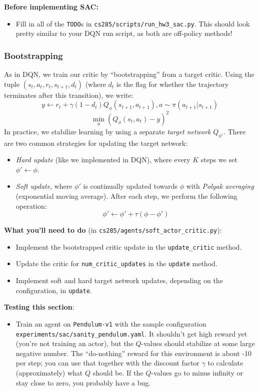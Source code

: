 \textbf{Before implementing SAC:}
\begin{itemize}
    \item Fill in all of the \verb|TODO|s in \verb|cs285/scripts/run_hw3_sac.py|. This should look pretty similar to your DQN run script, as both are off-policy methods!
\end{itemize}

\subsubsection{Bootstrapping}
As in DQN, we train our critic by ``bootstrapping'' from a target critic. Using the tuple $(s_t, a_t, r_t, s_{t+1}, d_{t})$ (where $d_t$ is the flag for whether the trajectory terminates after this transition), we write:
\[y \gets r_t + \gamma (1-d_t) Q_\phi(s_{t+1}, a_{t+1}), a \sim \pi(a_{t+1}|s_{t+1})\]
\[\min_\phi (Q_\phi(s_t, a_t) - y)^2\]
In practice, we stabilize learning by using a separate \textit{target network} $Q_{\phi'}$. There are two common strategies for updating the target network:
\begin{itemize}
    \item \textit{Hard update} (like we implemented in DQN), where every $K$ steps we set $\phi' \gets \phi$.
    \item \textit{Soft update}, where $\phi'$ is continually updated towards $\phi$ with \textit{Polyak averaging} (exponential moving average). After each step, we perform the following operation:
    \[\phi' \gets \phi' + \tau(\phi-\phi')\]
\end{itemize}

\textbf{What you'll need to do} (in \verb|cs285/agents/soft_actor_critic.py|):
\begin{itemize}
    \item Implement the bootstrapped critic update in the \verb|update_critic| method.
    \item Update the critic for \verb|num_critic_updates| in the \verb|update| method.
    \item Implement soft and hard target network updates, depending on the configuration, in \verb|update|.
\end{itemize}

\textbf{Testing this section}:
\begin{itemize}
    \item Train an agent on \verb|Pendulum-v1| with the sample configuration \verb|experiments/sac/sanity_pendulum.yaml|. It shouldn't get high reward yet (you're not training an actor), but the $Q$-values should stabilize at some large negative number. The ``do-nothing'' reward for this environment is about -10 per step; you can use that together with the discount factor $\gamma$ to calculate (approximately) what $Q$ should be. If the $Q$-values go to minus infinity or stay close to zero, you probably have a bug.
\end{itemize}


